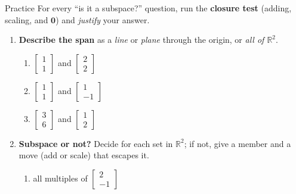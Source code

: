 \documentclass[10pt]{article}
\newcommand{\zero}{\mathbf{0}}
\begin{document}
\namedateperiod

\vspace{0.12in}

\begin{notesbox}{Practice}
For every ``is it a subspace?'' question, run the \textbf{closure test} (adding, scaling, and
$\zero$) and \emph{justify} your answer.

\begin{enumerate}[leftmargin=1.9em, itemsep=12pt]
  \item \textbf{Describe the span} as a \emph{line} or \emph{plane} through the origin, or
        \emph{all of $\mathbb{R}^2$}.
    \begin{enumerate}[label=(\alph*), leftmargin=1.8em, itemsep=4pt]
      \item $\begin{bmatrix} 1 \\ 1 \end{bmatrix}$ and $\begin{bmatrix} 2 \\ 2 \end{bmatrix}$ \hfill
      \item $\begin{bmatrix} 1 \\ 1 \end{bmatrix}$ and $\begin{bmatrix} 1 \\ -1 \end{bmatrix}$ \hfill
      \item $\begin{bmatrix} 3 \\ 6 \end{bmatrix}$ and $\begin{bmatrix} 1 \\ 2 \end{bmatrix}$
    \end{enumerate}
    \vspace{1.2cm}
  \item \textbf{Subspace or not?} Decide for each set in $\mathbb{R}^2$; if not, give a member and a
        move (add or scale) that escapes it.
    \begin{enumerate}[label=(\alph*), leftmargin=1.8em, itemsep=6pt]
      \item all multiples of $\begin{bmatrix} 2 \\ -1 \end{bmatrix}$ \vspace{0.7cm}

\end{enumerate}
\end{enumerate}
\end{notesbox}
\end{document}
